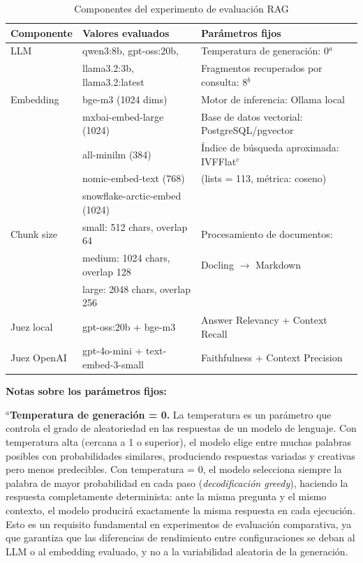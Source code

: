 \documentclass{article}
\begin{document}
\begin{table}[H]
\centering
\small
\begin{tabular}{|l|l|l|}
\hline
\textbf{Componente} & \textbf{Valores evaluados} & \textbf{Parámetros fijos} \\
\hline
LLM                & qwen3:8b, gpt-oss:20b,       & Temperatura de generación: 0$^{a}$ \\
                   & llama3.2:3b, llama3.2:latest & Fragmentos recuperados por consulta: 8$^{b}$ \\
\hline
Embedding          & bge-m3 (1024 dims)           & Motor de inferencia: Ollama local \\
                   & mxbai-embed-large (1024)     & Base de datos vectorial: PostgreSQL/pgvector \\
                   & all-minilm (384)             & Índice de búsqueda aproximada: IVFFlat$^{c}$ \\
                   & nomic-embed-text (768)       & (lists = 113, métrica: coseno) \\
                   & snowflake-arctic-embed (1024) & \\
\hline
Chunk size         & small: 512 chars, overlap 64  & Procesamiento de documentos: \\
                   & medium: 1024 chars, overlap 128 & Docling $\rightarrow$ Markdown \\
                   & large: 2048 chars, overlap 256 & \\
\hline
Juez local         & gpt-oss:20b + bge-m3         & Answer Relevancy + Context Recall \\
Juez OpenAI        & gpt-4o-mini + text-embed-3-small & Faithfulness + Context Precision \\
\hline
\end{tabular}
\caption{Componentes del experimento de evaluación RAG}
\label{tab:modelos}
\end{table}

\noindent\textbf{Notas sobre los parámetros fijos:}

\medskip
\noindent $^{a}$\textbf{Temperatura de generación = 0.} La temperatura es un
parámetro que controla el grado de aleatoriedad en las respuestas de un modelo
de lenguaje. Con temperatura alta (cercana a 1 o superior), el modelo elige
entre muchas palabras posibles con probabilidades similares, produciendo
respuestas variadas y creativas pero menos predecibles. Con temperatura = 0, el
modelo selecciona siempre la palabra de mayor probabilidad en cada paso
(\textit{decodificación greedy}), haciendo la respuesta completamente
determinista: ante la misma pregunta y el mismo contexto, el modelo producirá
exactamente la misma respuesta en cada ejecución. Esto es un requisito
fundamental en experimentos de evaluación comparativa, ya que garantiza que las
diferencias de rendimiento entre configuraciones se deban al LLM o al embedding
evaluado, y no a la variabilidad aleatoria de la generación.
\end{document}
